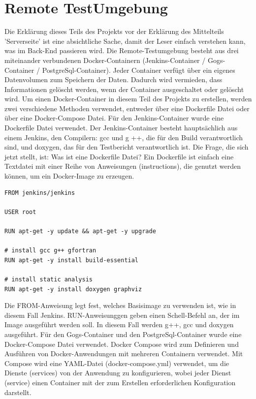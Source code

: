 \documentclass[a4paper,12pt,oneside]{book}
\begin{document}
\section{Remote TestUmgebung}
Die Erklärung dieses Teils des Projekts vor der Erklärung des Mittelteils 'Serverseite' ist eine absichtliche Sache, damit der Leser einfach verstehen kann, was im Back-End passieren wird.
\newline
Die Remote-Testumgebung besteht aus drei miteinander verbundenen Docker-Containern (Jenkins-Container / Gogs-Container / PostgreSql-Container). Jeder Container verfügt über ein eigenes Datenvolumen zum Speichern der Daten. Dadurch wird vermieden, dass Informationen gelöscht werden, wenn der Container ausgeschaltet oder gelöscht wird.
\newline
Um einen Docker-Container in diesem Teil des Projekts zu erstellen, werden zwei verschiedene Methoden verwendet, entweder über eine Dockerfile Datei oder über eine Docker-Compose Datei.
\newline
Für den Jenkins-Container wurde eine Dockerfile Datei verwendet. Der Jenkins-Container besteht hauptsächlich aus einem Jenkins, den Compilern: gcc und g ++, die für den Build verantwortlich sind, und doxygen, das für den Testbericht verantwortlich ist.
\newline
Die Frage, die sich jetzt stellt, ist: Was ist eine Dockerfile Datei?
\newline
Ein Dockerfile ist einfach eine Textdatei mit einer Reihe von Anweisungen (instructions), die genutzt werden können, um ein Docker-Image zu erzeugen.
\newline
\begin{lstlisting}[caption=Dockerfile - jenkins]
FROM jenkins/jenkins

USER root

RUN apt-get -y update && apt-get -y upgrade

# install gcc g++ gfortran
RUN apt-get -y install build-essential

# install static analysis
RUN apt-get -y install doxygen graphviz
\end{lstlisting}
Die FROM-Anweisung legt fest, welches Basisimage zu verwenden ist, wie in diesem Fall Jenkins. RUN-Anweisunggen geben einen Schell-Befehl an, der im Image ausgeführt werden soll. In diesem Fall werden g++, gcc und doxygen ausgeführt.
\newline
Für den Gogs-Container und den PostgreSql-Container wurde eine Docker-Compose Datei verwendet.
Docker Compose wird zum Definieren und Ausführen von Docker-Anwendungen mit mehreren Containern verwendet. Mit Compose wird eine YAML-Datei (docker-compose.yml) verwendet, um die Dienste (services) von der Anwendung zu konfigurieren, wobei jeder Dienst (service) einen Container mit der zum Erstellen erforderlichen Konfiguration darstellt.
\end{document}
